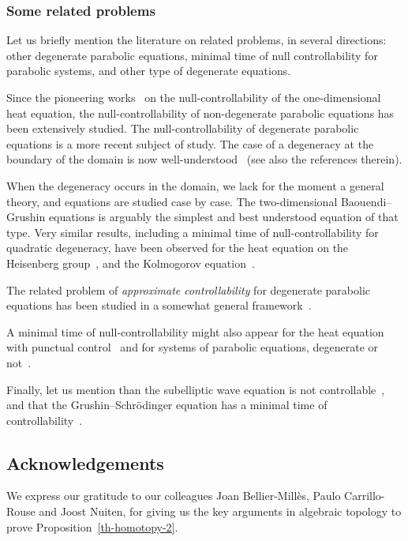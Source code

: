\documentclass[AHL,Unicode,longabstracts,published]{cedram}
\newcommand{\1}{\mathds 1}
\begin{document}
\subsubsection{Some related problems}

Let us briefly mention the literature on related problems, in several directions: other degenerate parabolic equations, minimal time of null controllability for parabolic systems, and other type of degenerate equations.

Since the pioneering works~\cite{FR71,Egorov63} on the null-controllability of the one-dimensional heat equation, the null-controllability of non-degenerate parabolic equations has been extensively studied. The null-controllability of degenerate parabolic equations is a more recent subject of study. The case of a degeneracy at the boundary of the domain is now well-understood~\cite{CMV16} (see also the references therein).

When the degeneracy occurs in the domain, we lack for the moment a general theory, and equations are studied case by case. The two-dimensional Baouendi--Grushin equations is arguably the simplest and best understood equation of that type. Very similar results, including a minimal time of null-controllability for quadratic degeneracy, have been observed for the heat equation on the Heisenberg group~\cite{BC17,BDE20}, and the Kolmogorov equation~\cite{Beauchard14,BHHR15,BZ09,
DR21,Koenig20}.

The related problem of \emph{approximate controllability} for degenerate parabolic equations has been studied in a somewhat general framework~\cite{LL22}.

A minimal time of null-controllability might also appear for the heat equation with punctual control~\cite{Dolecki73} and for systems of parabolic equations, degenerate or not~\cite{ABGd16,BBM20}.

Finally, let us mention than the subelliptic wave equation is not controllable~\cite{Letrouit23}, and that the Grushin--Schr\"odinger equation has a minimal time of controllability~\cite{BS22,FL21,LS23}.

\subsection*{Acknowledgements}

We express our gratitude to our colleagues Joan Bellier-Millès, Paulo Carrillo-Rouse and Joost Nuiten, for giving us the key arguments in algebraic topology to prove Proposition~\ref{th-homotopy-2}.
 
\end{document}
